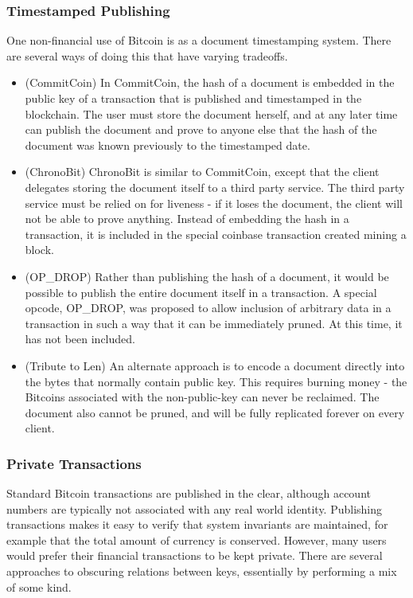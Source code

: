 \subsubsection{Timestamped Publishing}
One non-financial use of Bitcoin is as a document timestamping system. There are several ways of doing this that have varying tradeoffs.
\begin{itemize}
\item (CommitCoin) In CommitCoin, the hash of a document is embedded in the public key of a transaction that is published and timestamped in the blockchain. The user must store the document herself, and at any later time can publish the document and prove to anyone else that the hash of the document was known previously to the timestamped date.
\item (ChronoBit) ChronoBit is similar to CommitCoin, except that the client delegates storing the document itself to a third party service. The third party service must be relied on for liveness - if it loses the document, the client will not be able to prove anything. Instead of embedding the hash in a transaction, it is included in the special coinbase transaction created mining a block.
\item (OP\_DROP) Rather than publishing the hash of a document, it would be possible to publish the entire document itself in a transaction. A special opcode, OP\_DROP, was proposed to allow inclusion of arbitrary data in a transaction in such a way that it can be immediately pruned. At this time, it has not been included.
\item (Tribute to Len) An alternate approach is to encode a document directly into the bytes that normally contain public key. This requires burning money - the Bitcoins associated with the non-public-key can never be reclaimed. The document also cannot be pruned, and will be fully replicated forever on every client.
\end{itemize}

\subsubsection{Private Transactions}
Standard Bitcoin transactions are published in the clear, although account numbers are typically not associated with any real world identity. Publishing transactions makes it easy to verify that system invariants are maintained, for example that the total amount of currency is conserved. However, many users would prefer their financial transactions to be kept private. There are several approaches to obscuring relations between keys, essentially by performing a mix of some kind.

